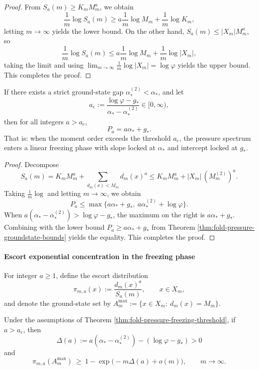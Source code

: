 \begin{proof}
From \(S_a(m)\ge K_m M_m^a\), we obtain
\[
\frac{1}{m}\log S_a(m)\ge a\frac{1}{m}\log M_m+\frac{1}{m}\log K_m,
\]
letting \(m\to\infty\) yields the lower bound.
On the other hand, \(S_a(m)\le |X_m|M_m^a\), so
\[
\frac{1}{m}\log S_a(m)\le a\frac{1}{m}\log M_m+\frac{1}{m}\log|X_m|,
\]
taking the limit and using \(\lim_{m\to\infty}\frac1m\log|X_m|=\log\varphi\) yields the upper bound. This completes the proof.
\end{proof}

\begin{theorem}\label{thm:fold-pressure-freezing-threshold}
If there exists a strict ground-state gap \(\alpha_*^{(2)}<\alpha_*\), and let
\[
a_{\mathrm c}:=\frac{\log\varphi-g_*}{\alpha_*-\alpha_*^{(2)}}\in[0,\infty),
\]
then for all integers \(a>a_{\mathrm c}\),
\[
P_a=a\alpha_*+g_*.
\]
That is: when the moment order exceeds the threshold \(a_{\mathrm c}\), the pressure spectrum enters a linear freezing phase with slope locked at \(\alpha_*\) and intercept locked at \(g_*\).
\end{theorem}

\begin{proof}
Decompose
\[
S_a(m)=K_m M_m^a+\sum_{d_m(x)<M_m} d_m(x)^a
\le K_m M_m^a+|X_m|\,(M_m^{(2)})^a.
\]
Taking \(\frac1m\log\) and letting \(m\to\infty\), we obtain
\[
P_a\le \max\{a\alpha_*+g_*,\ a\alpha_*^{(2)}+\log\varphi\}.
\]
When \(a(\alpha_*-\alpha_*^{(2)})>\log\varphi-g_*\), the maximum on the right is \(a\alpha_*+g_*\).
Combining with the lower bound \(P_a\ge a\alpha_*+g_*\) from Theorem \ref{thm:fold-pressure-groundstate-bounds} yields the equality. This completes the proof.
\end{proof}

\paragraph{Escort exponential concentration in the freezing phase}
For integer \(a\ge 1\), define the escort distribution
\[
\pi_{m,a}(x):=\frac{d_m(x)^a}{S_a(m)},\qquad x\in X_m,
\]
and denote the ground-state set by \(A_m^{\max}:=\{x\in X_m:\ d_m(x)=M_m\}\).

\begin{theorem}\label{thm:fold-escort-groundstate-concentration}
Under the assumptions of Theorem \ref{thm:fold-pressure-freezing-threshold}, if \(a>a_{\mathrm c}\), then
\[
\Delta(a):=a(\alpha_*-\alpha_*^{(2)})-(\log\varphi-g_*)>0
\]
and
\[
\pi_{m,a}(A_m^{\max})\ \ge\ 1-\exp\!\bigl(-m\Delta(a)+o(m)\bigr),
\qquad m\to\infty.
\]
\end{theorem}

